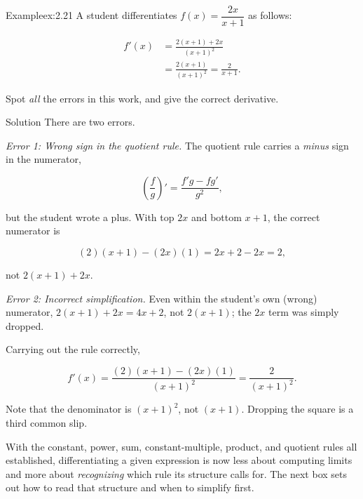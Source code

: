 \documentclass[a4paper,12pt,oneside]{memoir}
\begin{document}
\begin{workedexample}
\begin{envexample}{Example}{ex:2.21}{}
A student differentiates \(f(x) = \dfrac{2x}{x + 1}\) as follows:

\[ \begin{aligned}
          f'(x) &= \frac{2(x + 1) + 2x}{(x + 1)^{2}} \\[4pt]
                &= \frac{2(x + 1)}{(x + 1)^{2}} = \frac{2}{x + 1}.
        \end{aligned} \]

Spot \emph{all} the errors in this work, and give the correct derivative.
\end{envexample}
\begin{envsolution}{Solution}{}{}
There are two errors.

\emph{Error 1: Wrong sign in the quotient rule.} The quotient rule carries a \emph{minus} sign in the numerator,

\[ \left(\frac{f}{g}\right)' = \frac{f'g - fg'}{g^{2}}, \]

but the student wrote a plus. With top \(2x\) and bottom \(x + 1\), the correct numerator is

\[ (2)(x + 1) - (2x)(1) = 2x + 2 - 2x = 2, \]

not \(2(x + 1) + 2x\).

\emph{Error 2: Incorrect simplification.} Even within the student’s own (wrong) numerator, \(2(x + 1) + 2x = 4x + 2\), not \(2(x + 1)\); the \(2x\) term was simply dropped.

Carrying out the rule correctly,

\[ f'(x) = \frac{(2)(x + 1) - (2x)(1)}{(x + 1)^{2}} = \frac{2}{(x + 1)^{2}}. \]

Note that the denominator is \((x + 1)^{2}\), not \((x + 1)\). Dropping the square is a third common slip.
\end{envsolution}
\end{workedexample}
With the constant, power, sum, constant-multiple, product, and quotient rules all established, differentiating a given expression is now less about computing limits and more about \emph{recognizing} which rule its structure calls for. The next box sets out how to read that structure and when to simplify first.
\end{document}
